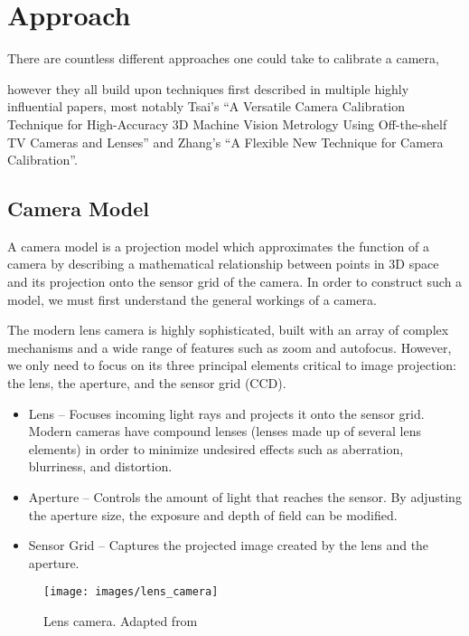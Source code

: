 \section{Approach} 

There are countless different approaches one could take to calibrate a camera, 



however they all build upon techniques first described in multiple highly influential papers, most notably Tsai's ``A Versatile Camera Calibration Technique for High-Accuracy 3D Machine Vision Metrology Using Off-the-shelf TV Cameras and Lenses'' and Zhang's ``A Flexible New Technique for Camera Calibration''. 
\subsection{Camera Model} \label{sec:camera_model}

A camera model is a projection model which approximates the function of a camera by describing a mathematical relationship between points in 3D space and its projection onto the sensor grid of the camera. In order to construct such a model, we must first understand the general workings of a camera.

The modern lens camera is highly sophisticated, built with an array of complex mechanisms and a wide range of features such as zoom and autofocus. However, we only need to focus on its three principal elements critical to image projection: the lens, the aperture, and the sensor grid (CCD). 

\begin{itemize}[leftmargin=!, itemindent=-5ex]
    \item Lens -- Focuses incoming light rays and projects it onto the sensor grid. Modern cameras have compound lenses (lenses made up of several lens elements) in order to minimize undesired effects such as aberration, blurriness, and distortion. 
    \item Aperture -- Controls the amount of light that reaches the sensor. By adjusting the aperture size, the exposure and depth of field can be modified.
    \item Sensor Grid -- Captures the projected image created by the lens and the aperture. 
\end{itemize}

\begin{figure}[H]
    \centering
    \texttt{[image: images/lens\_camera]}
    \caption{Lens camera. Adapted from \cite{coltonPhysics1232012}} \label{fig:lens_camera}
\end{figure}

